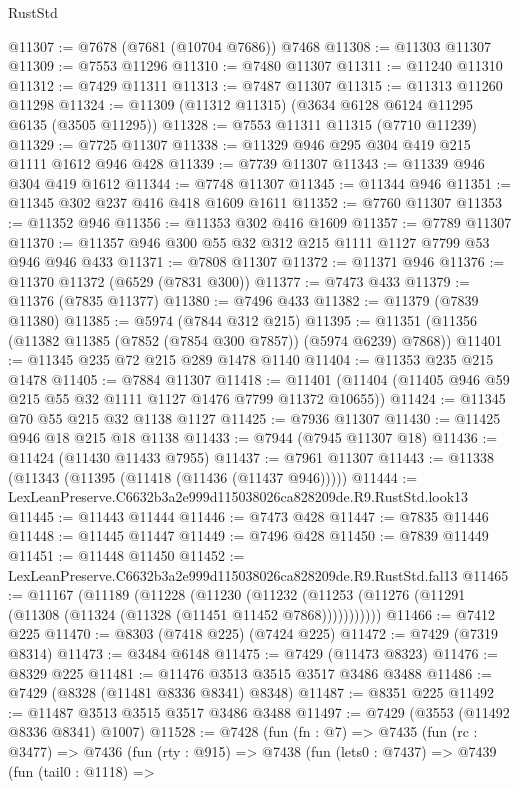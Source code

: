 \begin{lexlean}{RustStd}
\begin{coremodule}
@11307 := @7678 (@7681 (@10704 @7686)) @7468
@11308 := @11303 @11307
@11309 := @7553 @11296
@11310 := @7480 @11307
@11311 := @11240 @11310
@11312 := @7429 @11311
@11313 := @7487 @11307
@11315 := @11313 @11260 @11298
@11324 := @11309 (@11312 @11315) (@3634 @6128 @6124 @11295 @6135 (@3505 @11295))
@11328 := @7553 @11311 @11315 (@7710 @11239)
@11329 := @7725 @11307
@11338 := @11329 @946 @295 @304 @419 @215 @1111 @1612 @946 @428
@11339 := @7739 @11307
@11343 := @11339 @946 @304 @419 @1612
@11344 := @7748 @11307
@11345 := @11344 @946
@11351 := @11345 @302 @237 @416 @418 @1609 @1611
@11352 := @7760 @11307
@11353 := @11352 @946
@11356 := @11353 @302 @416 @1609
@11357 := @7789 @11307
@11370 := @11357 @946 @300 @55 @32 @312 @215 @1111 @1127 @7799 @53 @946 @946 @433
@11371 := @7808 @11307
@11372 := @11371 @946
@11376 := @11370 @11372 (@6529 (@7831 @300))
@11377 := @7473 @433
@11379 := @11376 (@7835 @11377)
@11380 := @7496 @433
@11382 := @11379 (@7839 @11380)
@11385 := @5974 (@7844 @312 @215)
@11395 := @11351 (@11356 (@11382 @11385 (@7852 (@7854 @300 @7857)) (@5974 @6239) @7868))
@11401 := @11345 @235 @72 @215 @289 @1478 @1140
@11404 := @11353 @235 @215 @1478
@11405 := @7884 @11307
@11418 := @11401 (@11404 (@11405 @946 @59 @215 @55 @32 @1111 @1127 @1476 @7799 @11372 @10655))
@11424 := @11345 @70 @55 @215 @32 @1138 @1127
@11425 := @7936 @11307
@11430 := @11425 @946 @18 @215 @18 @1138
@11433 := @7944 (@7945 @11307 @18)
@11436 := @11424 (@11430 @11433 @7955)
@11437 := @7961 @11307
@11443 := @11338 (@11343 (@11395 (@11418 (@11436 (@11437 @946)))))
@11444 := LexLeanPreserve.C6632b3a2e999d115038026ca828209de.R9.RustStd.look13
@11445 := @11443 @11444
@11446 := @7473 @428
@11447 := @7835 @11446
@11448 := @11445 @11447
@11449 := @7496 @428
@11450 := @7839 @11449
@11451 := @11448 @11450
@11452 := LexLeanPreserve.C6632b3a2e999d115038026ca828209de.R9.RustStd.fal13
@11465 := @11167
    (@11189
      (@11228
        (@11230
          (@11232 (@11253 (@11276 (@11291 (@11308 (@11324 (@11328 (@11451 @11452 @7868)))))))))))
@11466 := @7412 @225
@11470 := @8303 (@7418 @225) (@7424 @225)
@11472 := @7429 (@7319 @8314)
@11473 := @3484 @6148
@11475 := @7429 (@11473 @8323)
@11476 := @8329 @225
@11481 := @11476 @3513 @3515 @3517 @3486 @3488
@11486 := @7429 (@8328 (@11481 @8336 @8341) @8348)
@11487 := @8351 @225
@11492 := @11487 @3513 @3515 @3517 @3486 @3488
@11497 := @7429 (@3553 (@11492 @8336 @8341) @1007)
@11528 := @7428
    (fun (fn : @7) =>
    @7435
      (fun (rc : @3477) =>
      @7436
        (fun (rty : @915) =>
        @7438
          (fun (lets0 : @7437) =>
          @7439
            (fun (tail0 : @1118) =>

\end{coremodule}
\end{lexlean}
